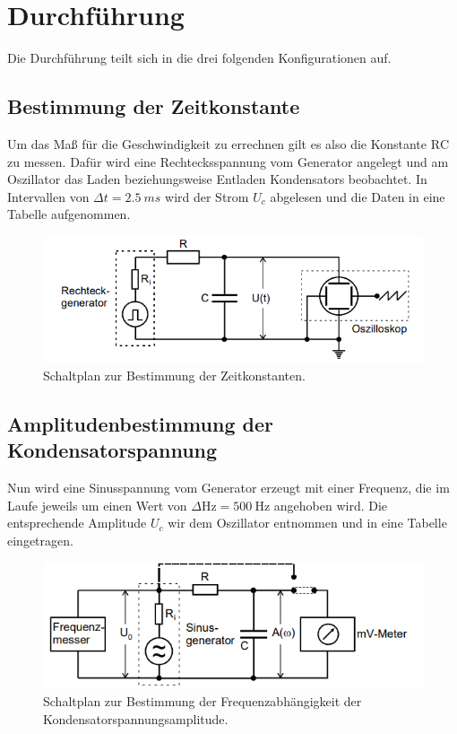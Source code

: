 \section{Durchführung}
Die Durchführung teilt sich in die  drei folgenden Konfigurationen auf.
\subsection{Bestimmung der Zeitkonstante}
Um das Maß für die Geschwindigkeit zu errechnen gilt es also die Konstante $\text{RC}$ zu messen.
Dafür wird eine Rechtecksspannung vom Generator angelegt und am Oszillator das Laden beziehungsweise Entladen
Kondensators beobachtet. In Intervallen von $\Delta t = \SI{2.5}{ms}$ wird der Strom $U_c$ abgelesen und die
Daten in eine Tabelle aufgenommen. 
\begin{figure}
    \centering
    \includegraphics[width=\textwidth]{bilder/RC.png}
    \caption{Schaltplan zur Bestimmung der Zeitkonstanten.\cite{skript}}
    \label{fig:RC}
\end{figure}

\subsection{Amplitudenbestimmung der Kondensatorspannung}
\label{sectionref}
Nun wird eine Sinusspannung vom Generator erzeugt mit einer Frequenz, die im Laufe jeweils um einen Wert
von $\Delta\si{\hertz}= \SI{500}{\hertz}$ angehoben wird. Die entsprechende Amplitude $U_c$ wir 
dem Oszillator entnommen und in eine Tabelle eingetragen.
 \begin{figure}
    \centering
    \includegraphics[width=\textwidth]{bilder/amplitude.png}
    \caption{Schaltplan zur Bestimmung der Frequenzabhängigkeit der Kondensatorspannungsamplitude.\cite{skript}}
    \label{fig:amp}
\end{figure}



